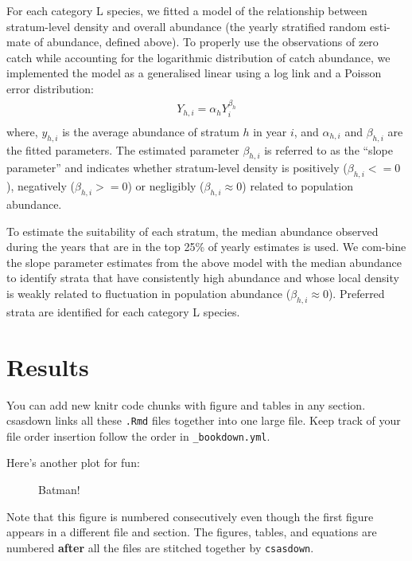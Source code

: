 \documentclass[12pt]{article}\usepackage[]{graphicx}\usepackage[]{color}
\begin{document}
For each category L species, we fitted a model of the relationship between stratum-level density and overall abundance (the yearly stratified random esti-mate of abundance, defined above). To properly use the observations of zero catch while accounting for the logarithmic distribution of catch abundance, we implemented the model as a generalised linear using a log link and a Poisson error distribution:
\begin{eqnarray*}\label{eqHabitat Selection}
Y_{h,i} = \alpha_{h} Y_{i}^{\beta_h}
\\
\end{eqnarray*}
where, \(y_{h,i}\) is the average abundance of stratum \(h\) in year \(i\), and \(\alpha_{h,i}\) and \(\beta_{h,i}\) are the fitted parameters. The estimated parameter \(\beta_{h,i}\) is referred to as the ``slope parameter'' and indicates whether stratum-level density is positively (\(\beta_{h,i} <= 0\)), negatively (\(\beta_{h,i} >= 0\)) or negligibly (\(\beta_{h,i} \approx 0\)) related to population abundance.

To estimate the suitability of each stratum, the median abundance observed during the years that are in the top 25\% of yearly estimates is used. We com-bine the slope parameter estimates from the above model with the median abundance to identify strata that have consistently high abundance and whose local density is weakly related to fluctuation in population abundance (\(\beta_{h,i} \approx 0\)). Preferred strata are identified for each category L species.

\section{Results}\label{results}

You can add new knitr code chunks with figure and tables in any section. csasdown links all these \texttt{.Rmd} files together into one large file. Keep track of your file order insertion follow the order in \texttt{\_bookdown.yml}.

Here's another plot for fun:




\begin{figure}[htb]

{\centering {} 

}

\caption{Batman!}\label{fig:batman}
\end{figure}
Note that this figure is numbered consecutively even though the first figure appears in a different file and section. The figures, tables, and equations are numbered \textbf{after} all the files are stitched together by \texttt{csasdown}.
\end{document}
